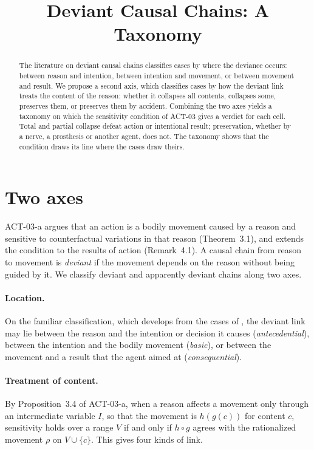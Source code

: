 \documentclass{situationist-preprint}
\title{Deviant Causal Chains: A Taxonomy}
\begin{document}
\maketitle

\begin{abstract}
The literature on deviant causal chains classifies cases by where the deviance occurs: between reason and intention, between intention and movement, or between movement and result. We propose a second axis, which classifies cases by how the deviant link treats the content of the reason: whether it collapses all contents, collapses some, preserves them, or preserves them by accident. Combining the two axes yields a taxonomy on which the sensitivity condition of ACT-03 gives a verdict for each cell. Total and partial collapse defeat action or intentional result; preservation, whether by a nerve, a prosthesis or another agent, does not. The taxonomy shows that the condition draws its line where the cases draw theirs.
\end{abstract}

\section{Two axes}

ACT-03-a argues that an action is a bodily movement caused by a reason and sensitive to counterfactual variations in that reason (Theorem~3.1), and extends the condition to the results of action (Remark~4.1). A causal chain from reason to movement is \emph{deviant} if the movement depends on the reason without being guided by it. We classify deviant and apparently deviant chains along two axes.

\paragraph{Location.} On the familiar classification, which \citet{Bishop1989} develops from the cases of \citet{Davidson1973}, the deviant link may lie between the reason and the intention or decision it causes (\emph{antecedential}), between the intention and the bodily movement (\emph{basic}), or between the movement and a result that the agent aimed at (\emph{consequential}).

\paragraph{Treatment of content.} By Proposition~3.4 of ACT-03-a, when a reason affects a movement only through an intermediate variable $I$, so that the movement is $h(g(c))$ for content $c$, sensitivity holds over a range $V$ if and only if $h \circ g$ agrees with the rationalized movement $\rho$ on $V \cup \{c\}$. This gives four kinds of link.
\end{document}
